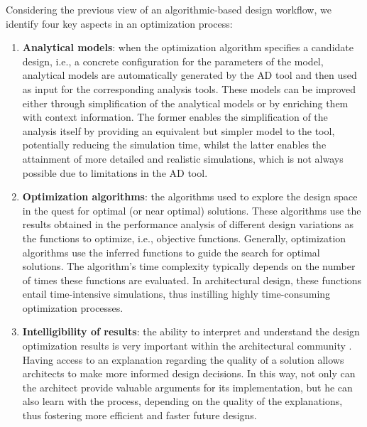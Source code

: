 Considering the previous view of an algorithmic-based design workflow, we identify four key aspects in an optimization process:

\begin{enumerate}
\item \textbf{Analytical models}: when the optimization algorithm specifies a candidate design, i.e., a concrete configuration for the parameters of the model, analytical models are automatically generated by the \ac{AD} tool and then used as input for the corresponding analysis tools. These models can be improved either through simplification of the analytical models or by enriching them with context information. The former enables the simplification of the analysis itself by providing an equivalent but simpler model to the tool, potentially reducing the simulation time, whilst the latter enables the attainment of more detailed and realistic simulations, which is not always possible due to limitations in the \ac{AD} tool. 

\item \textbf{Optimization algorithms}: the algorithms used to explore the design space in the quest for optimal (or near optimal) solutions. These algorithms use the results obtained in the performance analysis of different design variations as the functions to optimize, i.e., objective functions. Generally, optimization algorithms use the inferred functions to guide the search for optimal solutions. The algorithm's time complexity typically depends on the number of times these functions are evaluated. In architectural design, these functions entail time-intensive simulations, thus instilling highly time-consuming optimization processes.

\item \textbf{Intelligibility of results}: the ability to interpret and understand the design optimization results is very important within the architectural community \cite{Shi2016,Cichocka2017SURVEY}. Having access to an explanation regarding the quality of a solution allows architects to make more informed design decisions. In this way, not only can the architect provide valuable arguments for its implementation, but he can also learn with the process, depending on the quality of the explanations, thus fostering more efficient and faster future designs. 


\end{enumerate}
